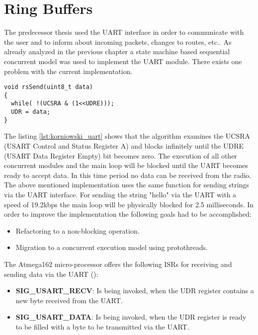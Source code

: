 \section{Ring Buffers}
The predecessor thesis \cite{korniowski} used the UART interface in order to communicate with the user and to inform about incoming packets, changes to routes, etc.. As already analyzed in the previous chapter a state machine based sequential concurrent model was used to implement the UART module. There exists one problem with the current implementation.

\begin{lstlisting}[float,label=lst:korniowski_uart,caption=UART module sending function from \cite{korniowski}]
void rsSend(uint8_t data)
{
  while( !(UCSRA & (1<<UDRE)));
  UDR = data;
}
\end{lstlisting}

The listing \ref{lst:korniowski_uart} shows that the algorithm examines the UCSRA (USART Control and Status Register A) and blocks infinitely until the UDRE (USART Data Register Empty) bit becomes zero. The execution of all other concurrent modules and the main loop will be blocked until the UART becomes ready to accept data. In this time period no data can be received from the radio. The above mentioned implementation uses the same function for sending strings via the UART interface. For sending the string "hello" via the UART with a speed of 19.2kbps the main loop will be physically blocked for 2.5 milliseconds. In order to improve the implementation the following goals had to be accomplished:

\begin{itemize}
\item Refactoring to a non-blocking operation.
\item Migration to a concurrent execution model using protothreads.
\end{itemize}

The Atmega162 micro-processor offers the following ISRs for receiving and sending data via the UART (\cite{atmega162datasheet}):

\begin{itemize}
\item \textbf{SIG\_USART\_RECV}: Is being invoked, when the UDR register contains a new byte received from the UART.
\item \textbf{SIG\_USART\_DATA}: Is being invoked, when the UDR register is ready to be filled with a byte to be transmitted via the UART.
\end{itemize}

